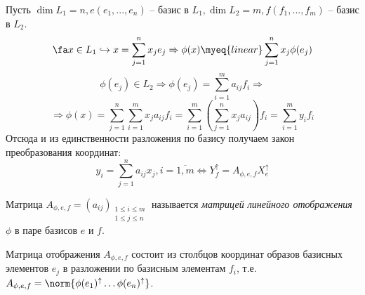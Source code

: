   Пусть $\dim L_1 = n, e(e_1,...,e_n)$ -- базис в $L_1, \dim L_2 = m, f(f_1,...,f_m)$ -- базис в $L_2$.
  \begin{equation*}
  \fa x \in L_1 \hookrightarrow x=\sum_{j=1}^n x_je_j \Rightarrow \phi(x)\myeq{linear}\sum_{j=1}^n x_j\phi(e_j) 
  \end{equation*}
  \begin{equation*}
  \phi(e_j) \in L_2 \Rightarrow \phi(e_j)=\sum_{i=1}^m a_{ij}f_i \Rightarrow 
  \end{equation*}
  \begin{equation*}
  \Rightarrow \phi(x)=\sum_{j=1}^n\sum_{i=1}^m x_ja_{ij}f_i = \sum_{i=1}^m(\sum_{j=1}^n x_ja_{ij})f_i = \sum_{i=1}^m y_if_i
  \end{equation*}
  Отсюда и из единственности разложения по базису получаем закон преобразования координат:
  \begin{equation}
  y_i=\sum_{j=1}^n a_{ij}x_j, i=\overline{1,m} \Leftrightarrow Y_f^\uparrow=A_{\phi,e,f}X_e^\uparrow
  \end{equation}
  \begin{defn}
  Матрица $A_{\phi,e,f}=(a_{ij})_{\substack{ 1\le i\le m \\ 1\le j\le n }}$ называется \textit{матрицей линейного отображения} $\phi$ в паре базисов $e$ и $f$.
  \end{defn}
  \begin{stt}\label{22.1.notion}
  Матрица отображения $A_{\phi,e,f}$ состоит из столбцов координат образов базисных элементов $e_j$ в разложении по базисным элементам $f_i$, т.е. $A_{\phi,e,f}=\norm{\phi(e_1)^\uparrow \ldots \phi(e_n)^\uparrow}$.
  \end{stt}
